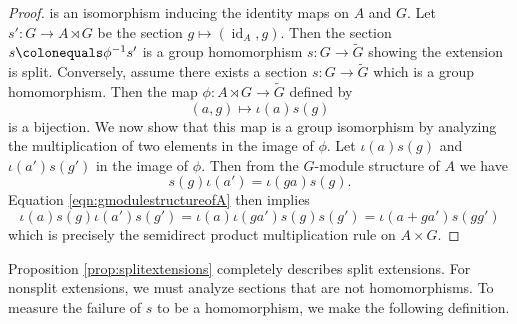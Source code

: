 \documentclass{dcthesis}
\newcommand{\defi}[1]{\textsf{#1}}
\newcommand{\wt}[1]{\widetilde{#1}}
\DeclareMathOperator{\id}{id}
\numberwithin{equation}{section}
\theoremstyle{definition}
\newtheorem{definition}[equation]{Definition}
\theoremstyle{remark}
\begin{document}
{{\begin{proof}
      is an isomorphism inducing the identity maps
      on $A$ and $G$.
      Let $s'\colon G\to A\rtimes G$ be the section
      $g\mapsto (\id_A,g)$.
      Then the section $s\colonequals\phi^{-1}s'$
      is a group homomorphism
      $s\colon G\to\wt{G}$
      showing the extension is split.
      Conversely,
      assume there exists
      a section
      $s\colon G\to\wt{G}$
      which is a group homomorphism.
      Then the map $\phi\colon A\rtimes G\to\wt{G}$ defined by
      \[
        (a,g)\mapsto\iota(a)s(g)
      \]
      is a bijection.
      We now show that this map is a group isomorphism
      by analyzing the multiplication of two
      elements in the image of $\phi$.
      Let $\iota(a)s(g)$ and $\iota(a')s(g')$
      in the image of $\phi$.
      Then
      from the $G$-module structure of $A$ we have
      \begin{equation}
        \label{eqn:gmodulestructureofA}
        s(g)\iota(a')=\iota(ga)s(g).
      \end{equation}
      Equation \ref{eqn:gmodulestructureofA}
      then implies
      \[
        \iota(a)s(g)\iota(a')s(g')=\iota(a)\iota(ga')s(g)s(g')=\iota(a+ga')s(gg')
      \]
      which is precisely the semidirect product multiplication
      rule on $A\times G$.
    \end{proof}
    Proposition \ref{prop:splitextensions}
    completely describes split extensions.
    For nonsplit extensions,
    we must analyze sections that are not homomorphisms.
    To measure the failure of $s$ to be a homomorphism,
    we make the following definition.
}}
\end{document}
